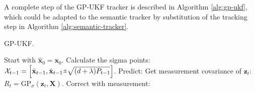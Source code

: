 A complete step of the GP-UKF tracker is described in Algorithm \ref{alg:gp-ukf}, which could be adapted to the semantic tracker by substitution of the tracking step in Algorithm \ref{alg:semantic-tracker}.
\begin{algorithm}
\caption{GP-UKF.}\label{alg:gp-ukf}
\begin{algorithmic}[1]
\State Start with $\hat{\mathbf{x}}_{0} = \mathbf{x}_{0}$.
\State Calculate the sigma points: $\mathcal{X}_{t-1} = \left[\hat{\mathbf{x}}_{t-1}, \hat{\mathbf{x}}_{t-1}\rpm\sqrt{(d+\lambda)P_{t-1}}\right]$.
\State Predict:
\State Get measurement covariance of $\mathbf{z}_{t}$: $ R_t = \text{GP}_{\sigma}(\mathbf{z}_t, \mathbf{X})$.
\State Correct with measurement:
\end{algorithmic}
\end{algorithm}

